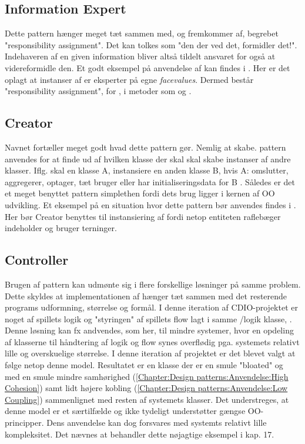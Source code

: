 \subsection{Information Expert}\label{Chapter:Design patterns:Anvendelse:Information Expert}
Dette pattern hænger meget tæt sammen med, og fremkommer af, begrebet "responsibility assignment". Det kan tolkes som "den der ved det, formidler det!". Indehaveren af en given information bliver altså tildelt ansvaret for også at videreformidle den. Et godt eksempel på anvendelse af  kan findes i . Her er det oplagt at instanser af  er eksperter på egne \textit{facevalues}. Dermed består "responsibility assignment", for , i metoder som  og . 

\subsection{Creator}\label{Chapter:Design patterns:Anvendelse:Creator}
Navnet fortæller meget godt hvad dette pattern gør. Nemlig at skabe.  pattern anvendes for at finde ud af hvilken klasse der skal skal skabe instanser af andre klasser. Iflg.  skal en klasse A, instansiere en anden klasse B, hvis A: omslutter, aggregerer, optager, tæt bruger eller har initialiseringsdata for B \cite{umlbook}. Således er det et meget benyttet pattern simplethen fordi dets brug ligger i kernen af OO udvikling. Et eksempel på en situation hvor dette pattern bør anvendes findes i . Her bør Creator benyttes til instansiering af  fordi netop entiteten raflebæger indeholder og bruger terninger. 

\subsection{Controller}\label{Chapter:Design patterns:Anvendelse:Controller}
Brugen af  pattern kan udmønte sig i flere forskellige løsninger på samme problem. Dette skyldes at implementationen af  hænger tæt sammen med det resterende programs udformning, størrelse og formål. I denne iteration af CDIO-projektet er noget af spillets logik og "styringen" af spillets flow lagt i samme /logik klasse, . Denne løsning kan fx andvendes, som her, til mindre systemer, hvor en opdeling af klasserne til håndtering af logik og flow synes overflødig pga. systemets relativt lille og overskuelige størrelse. I denne iteration af projektet er det blevet valgt at følge netop denne model. Resultatet er en klasse  der er en smule "bloated" og med en smule mindre samhørighed (\vref{Chapter:Design patterns:Anvendelse:High Cohesion}) samt lidt højere kobling (\vref{Chapter:Design patterns:Anvendelse:Low Coupling}) sammenlignet med resten af systemets klasser. Det understreges, at denne model er et særtilfælde og ikke tydeligt understøtter gængse OO-principper. Dens anvendelse kan dog forsvares med systemts relativt lille kompleksitet. Det nævnes at \cite{umlbook} behandler dette nøjagtige eksempel i kap. 17.

